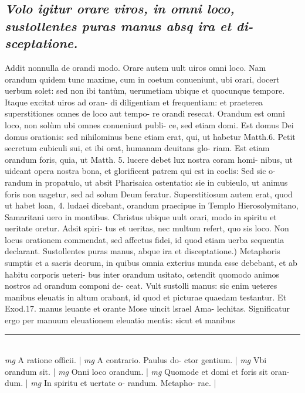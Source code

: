 \documentclass{article}
\begin{document}
\begin{pages}
\subsection*{\textit{Volo igitur orare viros, in omni loco, sustollentes puras manus absq ira et di- sceptatione. }}\pstart Addit nonnulla de orandi modo. Orare autem uult uiros omni loco. Nam orandum quidem tunc maxime, cum in coetum conueniunt, ubi orari, docert uerbum solet: sed non ibi tantùm, uerumetiam ubique  et quocunque  tempore. Itaque  excitat uiros ad oran- di diligentiam et frequentiam: et praeterea superstitiones omnes de loco aut tempo- re orandi resecat. Orandum est omni loco, non solùm ubi omnes conueniunt publi- ce, sed etiam domi. Est domus Dei domus orationis: sed nihilominus bene etiam erat, qui, ut habetur Matth.6. Petit secretum cubiculi sui, et ibi orat, humanam deuitans glo- riam. Est etiam orandum foris, quia, ut Matth. 5. lucere debet lux nostra coram homi- nibus, ut uideant opera nostra bona, et glorificent patrem qui est in coelis: Sed sic o- randum in propatulo, ut absit Pharisaica ostentatio: sie in cubieulo, ut animus foris non uagetur, sed ad solum Deum feratur. Superstitiosum autem erat, quod ut habet loan, 4. ludaei dicebant, orandum praecipue in Templo Hierosolymitano, Samaritani uero in montibus. Christus ubique  uult orari, modo in spiritu et ueritate oretur. Adsit spiri- tus et ueritas, nec multum refert, quo sis loco. Non locus orationem commendat, sed affectus fidei, id quod etiam uerba sequentia declarant.  \pend\pstart Sustollentes puras manus, abque  ira et disceptatione.) Metaphoris sumptis et a sacris deorum, in quibus omnia exterius munda esse debebant, et ab habitu corporis ueteri- bus inter orandum usitato, ostendit quomodo animos nostros ad orandum componi de- ceat. Vult sustolli manus: sic enim ueteres manibus eleuatis in altum orabant, id quod et picturae quaedam testantur. Et Exod.17. manus leuante et orante Mose uincit lsrael Ama- lechitas. Significatur ergo per manuum eleuationem eleuatio mentis: sicut et manibus  \pend
\vspace{0.5cm}\noindent
\vspace{0.2cm}\rule{1cm}{0.2pt}\\ 
\hspace{0.2cm}\textit{mg}
\footnotesize A ratione officii. 
\normalsize| 
\hspace{0.2cm}\textit{mg}
\footnotesize A contrario. Paulus do- ctor gentium. 
\normalsize| 
\hspace{0.2cm}\textit{mg}
\footnotesize Vbi orandum sit. 
\normalsize| 
\hspace{0.2cm}\textit{mg}
\footnotesize Onni loco orandum. 
\normalsize| 
\hspace{0.2cm}\textit{mg}
\footnotesize Quomode et domi et foris sit oran- dum. 
\normalsize| 
\hspace{0.2cm}\textit{mg}
\footnotesize In spiritu et uertate o- randum. Metapho- rae. 
\normalsize| 

\end{pages}
\end{document}
